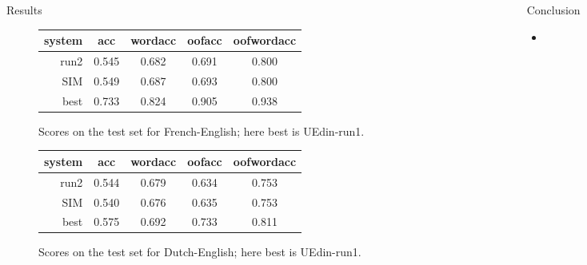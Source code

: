 \documentclass[final,t]{beamer}
\begin{document}
\begin{frame}{}
\begin{columns}
\begin{column}{.64\linewidth}
\begin{block}{Results}
\begin{figure}[t]
  \begin{center}
  \begin{tabular}{|r|c|c|c|c|}
    \hline
    system & acc      & wordacc  & oofacc & oofwordacc \\
    \hline
    run2  & 0.545  & 0.682 & 0.691 & 0.800 \\
    SIM        &  0.549 & 0.687 & 0.693 & 0.800 \\
    best & 0.733 & 0.824 & 0.905 & 0.938 \\
    \hline
  \end{tabular}
  \end{center}
\caption{Scores on the test set for French-English; here best is UEdin-run1.}
\label{fig:theresults-fr-en}
\end{figure}

\begin{figure}[t]
  \begin{center}
  \begin{tabular}{|r|c|c|c|c|}
    \hline
    system & acc      & wordacc  & oofacc & oofwordacc \\
    \hline
    run2        &  0.544      &  0.679  & 0.634   & 0.753    \\
    SIM              &  0.540      &  0.676  & 0.635   & 0.753    \\
    best       &  0.575   & 0.692  & 0.733      &  0.811 \\
    \hline
  \end{tabular}
  \end{center}
\caption{Scores on the test set for Dutch-English; here best is UEdin-run1.}
\label{fig:theresults-nl-en}
\end{figure}

\end{block}

  \end{column}

  \begin{column}{.31\linewidth}

\begin{block}{Conclusion}

\begin{itemize}
\item 
\end{itemize}

\end{block}

  \end{column}
\end{columns}

\end{frame}
\end{document}

